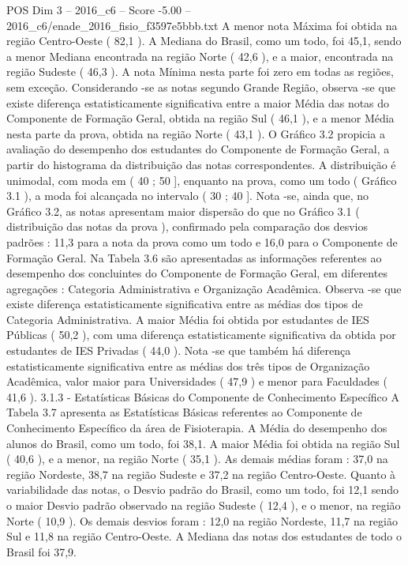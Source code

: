 \begin{textsample}{POS Dim 3 – 2016\_c6 – Score -5.00 – 2016\_c6/enade\_2016\_fisio\_f3597e5bbb.txt}
A menor nota Máxima foi obtida na região Centro-Oeste ( 82,1 ).
A Mediana do Brasil, como um todo, foi 45,1, sendo a menor Mediana encontrada na região Norte ( 42,6 ), e a maior, encontrada na região Sudeste ( 46,3 ).
A nota Mínima nesta parte foi zero em todas as regiões, sem exceção.
Considerando -se as notas segundo Grande Região, observa -se que existe diferença estatisticamente significativa entre a maior Média das notas do Componente de Formação Geral, obtida na região Sul ( 46,1 ), e a menor Média nesta parte da prova, obtida na região Norte ( 43,1 ).
O Gráfico 3.2 propicia a avaliação do desempenho dos estudantes do Componente de Formação Geral, a partir do histograma da distribuição das notas correspondentes.
A distribuição é unimodal, com moda em ( 40 ; 50 ], enquanto na prova, como um todo ( Gráfico 3.1 ), a moda foi alcançada no intervalo ( 30 ; 40 ].
Nota -se, ainda que, no Gráfico 3.2, as notas apresentam maior dispersão do que no Gráfico 3.1 ( distribuição das notas da prova ), confirmado pela comparação dos desvios padrões : 11,3 para a nota da prova como um todo e 16,0 para o Componente de Formação Geral.
Na Tabela 3.6 são apresentadas as informações referentes ao desempenho dos concluintes do Componente de Formação Geral, em diferentes agregações : Categoria Administrativa e Organização Acadêmica.
Observa -se que existe diferença estatisticamente significativa entre as médias dos tipos de Categoria Administrativa.
A maior Média foi obtida por estudantes de IES Públicas ( 50,2 ), com uma diferença estatisticamente significativa da obtida por estudantes de IES Privadas ( 44,0 ).
Nota -se que também há diferença estatisticamente significativa entre as médias dos três tipos de Organização Acadêmica, valor maior para Universidades ( 47,9 ) e menor para Faculdades ( 41,6 ). 3.1.3 - Estatísticas Básicas do Componente de Conhecimento Específico A Tabela 3.7 apresenta as Estatísticas Básicas referentes ao Componente de Conhecimento Específico da área de Fisioterapia.
A Média do desempenho dos alunos do Brasil, como um todo, foi 38,1.
A maior Média foi obtida na região Sul ( 40,6 ), e a menor, na região Norte ( 35,1 ).
As demais médias foram : 37,0 na região Nordeste, 38,7 na região Sudeste e 37,2 na região Centro-Oeste.
Quanto à variabilidade das notas, o Desvio padrão do Brasil, como um todo, foi 12,1 sendo o maior Desvio padrão observado na região Sudeste ( 12,4 ), e o menor, na região Norte ( 10,9 ).
Os demais desvios foram : 12,0 na região Nordeste, 11,7 na região Sul e 11,8 na região Centro-Oeste.
A Mediana das notas dos estudantes de todo o Brasil foi 37,9.

\end{textsample}
